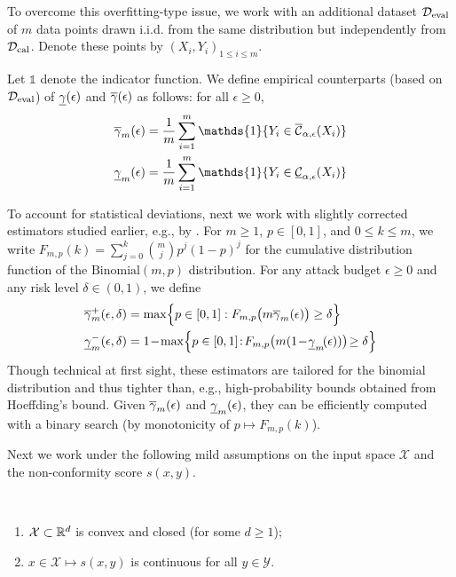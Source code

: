To overcome this overfitting-type issue, we work with an additional dataset $\mathcal{D}_\mathrm{eval}$ of $m$ data points drawn i.i.d. from the same distribution but independently from $\mathcal{D}_\mathrm{cal}$. Denote these points by $(X_i,Y_i)_{1 \leq i \leq m}$.

Let $\mathds{1}$ denote the indicator function. We define empirical counterparts (based on $\mathcal{D}_\mathrm{eval}$) of $\underline{\gamma}(\epsilon)$ and $\overline{\gamma}(\epsilon)$ as follows: for all $\epsilon \geq 0$,
\begin{align}
    \covmaxm(\epsilon) &= \frac{1}{m} \sum_{i=1}^{m} \mathds{1}\{Y_i \in \unionmetaset(X_i)\}\label{eq:covmaxm}\\
    \covminm(\epsilon) &= \frac{1}{m} \sum_{i=1}^{m} \mathds{1}\{Y_i \in \intermetaset(X_i)\} \label{eq:covminm}
\end{align}


To account for statistical deviations, next we work with slightly corrected estimators studied earlier, e.g., by  \citet{langford2005tutorial}. For $m \geq 1$, $p \in [0,1]$, and $0 \leq k \leq m$, we write $F_{m,p}(k) = \sum_{j=0}^k {m \choose j} p^j (1-p)^j$ for the cumulative distribution function of the $\textrm{Binomial}(m,p)$ distribution. For any attack budget $\epsilon \geq 0$ and any risk level $\delta \in (0,1)$, we define
\begin{align}
    \covmaxmp(\epsilon,\delta) &= \max \Bigl\{p \in [0,1] : F_{m,p}\bigl(m\covmaxm(\epsilon)\bigr)\geq \delta \Bigr\} \label{eq:covmaxmp}\\
    \covminmm(\epsilon,\delta) &= 1\! -\! \max\Bigl\{p \in [0,1]\!:\!F_{m,p}\bigl(m(1\!-\! \covminm\!(\epsilon))\bigr) \! \geq \delta\Bigr\}\label{eq:covminmm}
\end{align}
Though technical at first sight, these estimators are tailored for the binomial distribution and thus tighter than, e.g., high-probability bounds obtained from Hoeffding's bound. Given $\overline{\gamma}_{m}(\epsilon)$ and $\underline{\gamma}_{m}(\epsilon)$, they can be efficiently computed with a binary search (by monotonicity of $p \mapsto F_{m,p}(k)$).

Next we work under the following mild assumptions on the input space $\mathcal{X}$ and the non-conformity score $s(x,y)$.

\begin{assumption} 
\label{assum:X-s}
\ \\[-0.7cm]
\begin{enumerate}[label=(A\arabic*)]
    \item $\mathcal{X} \subset \mathbb{R}^d$ is convex and closed (for some $d \geq 1$);
    \item $x \in \mathcal{X} \mapsto s(x, y)$ is continuous for all $y\in\mathcal{Y}$.
\end{enumerate}    
\end{assumption}

